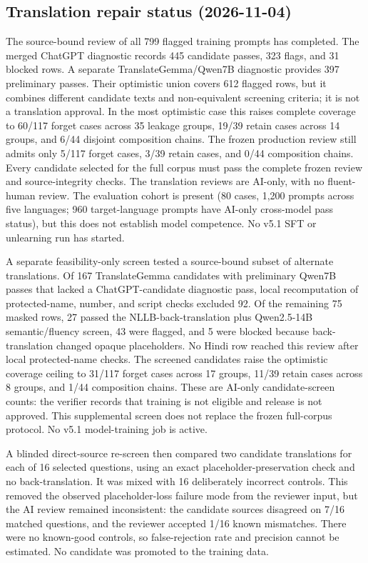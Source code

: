 \documentclass[10pt,a4paper]{article}
\begin{document}
\subsection*{Translation repair status (2026-11-04)}

The source-bound review of all 799 flagged training prompts has completed. The merged ChatGPT diagnostic records 445 candidate passes, 323 flags, and 31 blocked rows. A separate TranslateGemma/Qwen7B diagnostic provides 397 preliminary passes. Their optimistic union covers 612 flagged rows, but it combines different candidate texts and non-equivalent screening criteria; it is not a translation approval. In the most optimistic case this raises complete coverage to 60/117 forget cases across 35 leakage groups, 19/39 retain cases across 14 groups, and 6/44 disjoint composition chains. The frozen production review still admits only 5/117 forget cases, 3/39 retain cases, and 0/44 composition chains. Every candidate selected for the full corpus must pass the complete frozen review and source-integrity checks. The translation reviews are AI-only, with no fluent-human review. The evaluation cohort is present (80 cases, 1,200 prompts across five languages; 960 target-language prompts have AI-only cross-model pass status), but this does not establish model competence. No v5.1 SFT or unlearning run has started.

A separate feasibility-only screen tested a source-bound subset of alternate translations. Of 167 TranslateGemma candidates with preliminary Qwen7B passes that lacked a ChatGPT-candidate diagnostic pass, local recomputation of protected-name, number, and script checks excluded 92. Of the remaining 75 masked rows, 27 passed the NLLB-back-translation plus Qwen2.5-14B semantic/fluency screen, 43 were flagged, and 5 were blocked because back-translation changed opaque placeholders. No Hindi row reached this review after local protected-name checks. The screened candidates raise the optimistic coverage ceiling to 31/117 forget cases across 17 groups, 11/39 retain cases across 8 groups, and 1/44 composition chains. These are AI-only candidate-screen counts: the verifier records that training is not eligible and release is not approved. This supplemental screen does not replace the frozen full-corpus protocol. No v5.1 model-training job is active.

A blinded direct-source re-screen then compared two candidate translations for each of 16 selected questions, using an exact placeholder-preservation check and no back-translation. It was mixed with 16 deliberately incorrect controls. This removed the observed placeholder-loss failure mode from the reviewer input, but the AI review remained inconsistent: the candidate sources disagreed on 7/16 matched questions, and the reviewer accepted 1/16 known mismatches. There were no known-good controls, so false-rejection rate and precision cannot be estimated. No candidate was promoted to the training data.
\end{document}
